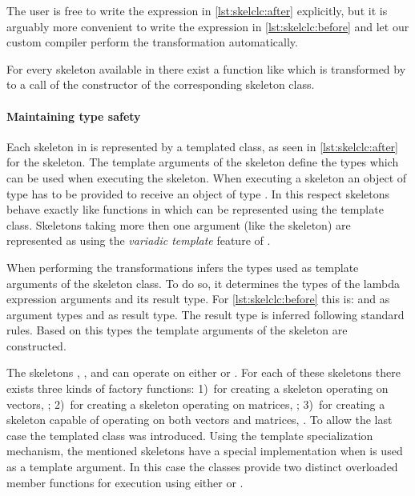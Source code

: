 The user is free to write the expression in \autoref{lst:skelclc:after} explicitly, but it is arguably more convenient to write the expression in \autoref{lst:skelclc:before} and let our custom compiler perform the transformation automatically.

For every skeleton available in \SkelCL there exist a function like  which is transformed by  to a call of the constructor of the corresponding skeleton class.

\paragraph{Maintaining type safety}
Each skeleton in \SkelCL is represented by a templated class, as seen in \autoref{lst:skelclc:after} for the \zip skeleton.
The template arguments of the skeleton define the types which can be used when executing the skeleton.
When executing a skeleton  an object of type  has to be provided to receive an object of type .
In this respect skeletons behave exactly like functions in \Cpp which can be represented using the  template class.
Skeletons taking more then one argument (like the  skeleton) are represented as  using the \emph{variadic template} feature of \Cpp.

When performing the transformations  infers the types used as template arguments of the skeleton class.
To do so, it determines the types of the lambda expression arguments and its result type.
For \autoref{lst:skelclc:before} this is:  and  as argument types and  as result type.
The result type is inferred following standard \Cpp rules.
Based on this types the template arguments of the skeleton are constructed.

The skeletons \map, \zip, and \stencil can operate on either  or .
For each of these skeletons there exists three kinds of factory functions:
1)~for creating a skeleton operating on vectors, \eg {};
2)~for creating a skeleton operating on matrices, \eg {};
3)~for creating a skeleton capable of operating on both vectors and matrices, \eg {}.
To allow the last case the templated class  was introduced.
Using the template specialization mechanism, the mentioned skeletons have a special implementation when  is used as a template argument.
In this case the classes provide two distinct overloaded member functions for execution using either  or .

